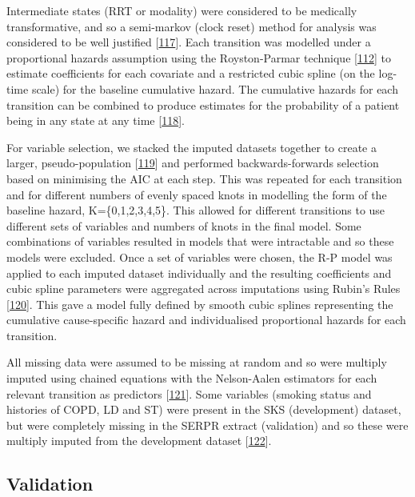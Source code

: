 \documentclass[12pt,PhD,twoside,openright]{muthesis}
\begin{document}
Intermediate states (RRT or modality) were considered to be medically transformative, and so a semi-markov (clock reset) method for analysis was considered to be well justified {[}\protect\hyperlink{ref-meira-machado_multi-state_2009}{117}{]}. Each transition was modelled under a proportional hazards assumption using the Royston-Parmar technique {[}\protect\hyperlink{ref-royston_flexible_2002}{112}{]} to estimate coefficients for each covariate and a restricted cubic spline (on the log-time scale) for the baseline cumulative hazard. The cumulative hazards for each transition can be combined to produce estimates for the probability of a patient being in any state at any time {[}\protect\hyperlink{ref-putter_tutorial_2007}{118}{]}.

For variable selection, we stacked the imputed datasets together to create a larger, pseudo-population {[}\protect\hyperlink{ref-wood_how_2008}{119}{]} and performed backwards-forwards selection based on minimising the AIC at each step. This was repeated for each transition and for different numbers of evenly spaced knots in modelling the form of the baseline hazard, K=\{0,1,2,3,4,5\}. This allowed for different transitions to use different sets of variables and numbers of knots in the final model. Some combinations of variables resulted in models that were intractable and so these models were excluded. Once a set of variables were chosen, the R-P model was applied to each imputed dataset individually and the resulting coefficients and cubic spline parameters were aggregated across imputations using Rubin's Rules {[}\protect\hyperlink{ref-rubin_multiple_1984}{120}{]}. This gave a model fully defined by smooth cubic splines representing the cumulative cause-specific hazard and individualised proportional hazards for each transition.

All missing data were assumed to be missing at random and so were multiply imputed using chained equations with the Nelson-Aalen estimators for each relevant transition as predictors {[}\protect\hyperlink{ref-white_imputing_2009}{121}{]}. Some variables (smoking status and histories of COPD, LD and ST) were present in the SKS (development) dataset, but were completely missing in the SERPR extract (validation) and so these were multiply imputed from the development dataset {[}\protect\hyperlink{ref-janssen_dealing_2009}{122}{]}.

\hypertarget{validation}{%
\subsection{Validation}\label{validation}}
\end{document}
